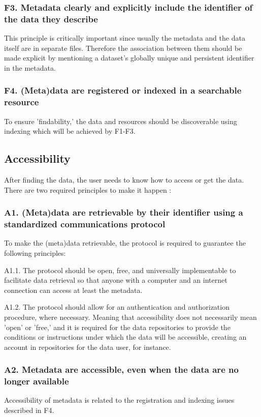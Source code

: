 \subsubsection*{F3. Metadata clearly and explicitly include the identifier of the data they describe}
This principle is critically important since usually the metadata and the data itself are in separate files. Therefore the association between them should be made explicit by mentioning a dataset's globally unique and persistent identifier in the metadata. 
\subsubsection*{F4. (Meta)data are registered or indexed in a searchable resource}
To ensure 'findability,' the data and resources should be discoverable using indexing which will be achieved by F1-F3.

\subsection*{Accessibility}
After finding the data, the user needs to know how to access or get the data. There are two required principles to make it happen :

\subsubsection*{A1. (Meta)data are retrievable by their identifier using a standardized communications protocol}
To make the (meta)data retrievable, the protocol is required to guarantee the following principles: 

\quad A1.1. The protocol should be open, free, and universally implementable to facilitate data retrieval so that anyone with a computer and an internet connection can access at least the metadata.

\quad A1.2. The protocol should allow for an authentication and authorization procedure, where necessary. Meaning that accessibility does not necessarily mean 'open' or 'free,' and it is required for the data repositories to provide the conditions or instructions under which the data will be accessible, creating an account in repositories for the data user, for instance.

\subsubsection*{A2. Metadata are accessible, even when the data are no longer available}  Accessibility of metadata is related to the registration and indexing issues described in F4. 


